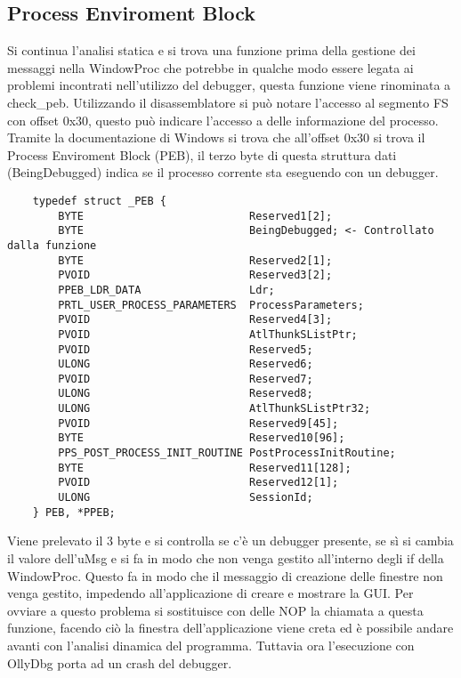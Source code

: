\documentclass[a4paper,12pt]{article}
\begin{document}
\subsection{Process Enviroment Block}
Si continua l'analisi statica e si trova una funzione prima della gestione dei messaggi nella WindowProc che potrebbe in qualche modo essere legata ai problemi incontrati nell'utilizzo del debugger, questa funzione viene rinominata a check\_peb. Utilizzando il disassemblatore si può notare l'accesso al segmento FS con offset 0x30, questo può indicare l'accesso a delle informazione del processo. Tramite la documentazione di Windows si trova che all'offset 0x30 si trova il Process Enviroment Block (PEB), il terzo byte di questa struttura dati (BeingDebugged) indica se il processo corrente sta eseguendo con un debugger.

\begin{verbatim}
	typedef struct _PEB {
		BYTE                          Reserved1[2];
		BYTE                          BeingDebugged; <- Controllato dalla funzione
		BYTE                          Reserved2[1];
		PVOID                         Reserved3[2];
		PPEB_LDR_DATA                 Ldr;
		PRTL_USER_PROCESS_PARAMETERS  ProcessParameters;
		PVOID                         Reserved4[3];
		PVOID                         AtlThunkSListPtr;
		PVOID                         Reserved5;
		ULONG                         Reserved6;
		PVOID                         Reserved7;
		ULONG                         Reserved8;
		ULONG                         AtlThunkSListPtr32;
		PVOID                         Reserved9[45];
		BYTE                          Reserved10[96];
		PPS_POST_PROCESS_INIT_ROUTINE PostProcessInitRoutine;
		BYTE                          Reserved11[128];
		PVOID                         Reserved12[1];
		ULONG                         SessionId;
	} PEB, *PPEB;
\end{verbatim}

 Viene prelevato il 3 byte e si controlla se c'è un debugger presente, se sì si cambia il valore dell'uMsg e si fa in modo che non venga gestito all'interno degli if della WindowProc. Questo fa in modo che il messaggio di creazione delle finestre non venga gestito, impedendo all'applicazione di creare e mostrare la GUI. Per ovviare a questo problema si sostituisce con delle NOP la chiamata a questa funzione, facendo ciò la finestra dell'applicazione viene creta ed è possibile andare avanti con l'analisi dinamica del programma. Tuttavia ora l'esecuzione con OllyDbg porta ad un crash del debugger.
\end{document}

